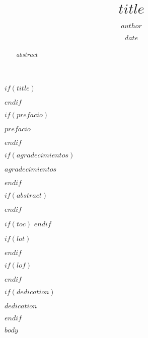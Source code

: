 \documentclass[12pt,oneside]{templates/facsothesis}
\title{$title$}
\author{$author$}
\date{$date$}
\begin{document}
\raggedbottom

$if(title)$
  \maketitle
$endif$

\frontmatter %
 \pagestyle{empty} 

$if(prefacio)$
  \begin{prefacio}
  \thispagestyle{empty}
    $prefacio$
  \end{prefacio}
$endif$

$if(agradecimientos)$
  \begin{agradecimientos}
  \thispagestyle{empty}
  \setlength\parskip{1em plus 0.1em minus 0.2em}
    $agradecimientos$
  \end{agradecimientos}
$endif$

$if(abstract)$
  \begin{abstract}
  \thispagestyle{empty}
  \setlength\parskip{1em plus 0.1em minus 0.2em}
    $abstract$
  \end{abstract}
$endif$

$if(toc)$
  \setcounter{tocdepth}{$toc-depth$}
  \setlength{\parskip}{0pt}
  \tableofcontents
  \thispagestyle{empty}
$endif$

\setlength\parskip{1em plus 0.1em minus 0.2em}

$if(lot)$
  \listoftables
  \thispagestyle{empty}
$endif$

$if(lof)$
  \listoffigures
  \thispagestyle{empty}
$endif$

$if(dedication)$
  \begin{dedication}
    $dedication$
  \end{dedication}
$endif$

\mainmatter %
\titleformat{\chapter}{\normalfont\Huge\bfseries}{\thechapter}{1em}{}
\pagestyle{fancyplain} %

$body$

\end{document}
